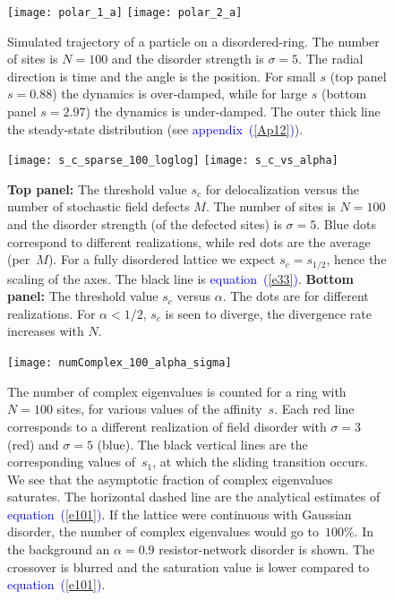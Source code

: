 \documentclass[aps,pre,floats,floatfix,twocolumn]{revtex4}
\newcommand{\Eq}[1]{\textcolor{blue}{{equation}\!~(\ref{#1})}}
\newcommand{\Ap}[1]{\textcolor{blue}{{appendix}\!~(\ref{#1})}}
\begin{document}
\clearpage


\begin{figure}
\texttt{[image: polar\_1\_a]}
\texttt{[image: polar\_2\_a]}

\caption{\label{traj}
Simulated trajectory of a particle on a disordered-ring.
The number of sites is $N{=}100$ and the disorder strength is $\sigma{=}5$.
The radial direction is time and the angle is the position. 
For small $s$ (top panel $s{=}0.88$) the dynamics is over-damped, 
while for large $s$ (bottom panel $s{=}2.97$) the dynamics is under-damped. 
The outer thick line the steady-state distribution (see \Ap{Ap12}). 
}
\end{figure}


\begin{figure}
\texttt{[image: s\_c\_sparse\_100\_loglog]}
\texttt{[image: s\_c\_vs\_alpha]}
%
\caption{\label{sparse}
{\bf Top panel:} The threshold value $s_c$ for delocalization versus the number of stochastic field defects $M$. 
The number of sites is $N{=}100$ and the disorder strength (of the defected sites) is $\sigma{=}5$. 
Blue dots correspond to different realizations, while red dots are the average (per~$M$). 
For a fully disordered lattice we expect $s_c=s_{1/2}$, hence the scaling of the axes. 
The black line is \Eq{e33}. 
{\bf Bottom panel:} The threshold value $s_c$ versus $\alpha$. The dots are for different realizations. For $\alpha<1/2$, $s_c$ is seen to diverge, the divergence rate increases with $N$.
}
\end{figure}


\begin{figure}
\texttt{[image: numComplex\_100\_alpha\_sigma]}


\caption{\label{figCplxSat}
The number of complex eigenvalues is counted for a ring with $N{=}100$ sites, 
for various values of the affinity~$s$. Each red line corresponds to a different
realization of field disorder with $\sigma{=}3$ (red) and $\sigma{=}5$ (blue). 
The black vertical lines are the corresponding values of~$s_1$, 
at which the sliding transition occurs. 
We see that the asymptotic fraction of complex eigenvalues saturates. 
The horizontal dashed line are the analytical estimates of \Eq{e101}. 
If the lattice were continuous with Gaussian disorder, 
the number of complex eigenvalues would go to~$100\%$.
In the background an ${\alpha=0.9}$ resistor-network disorder is shown. 
The crossover is blurred and the saturation value is lower compared to \Eq{e101}.  
}
\end{figure}
\end{document}
